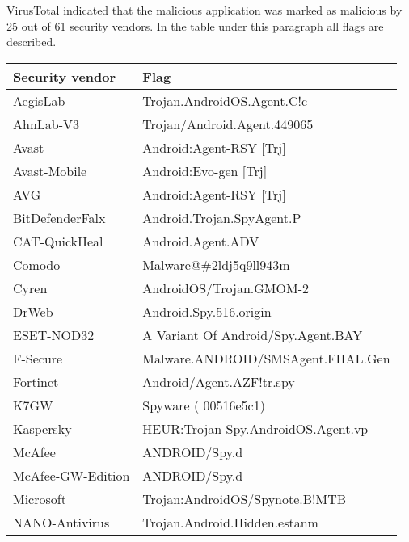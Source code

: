 VirusTotal indicated that the malicious application was marked as malicious by 25 out of 61 security vendors.
In the table under this paragraph all flags are described.

\begin{tabular}{|l|l|}
    \hline
    \textbf{Security vendor} & \textbf{Flag}                        \\ \hline
    AegisLab                 & Trojan.AndroidOS.Agent.C!c           \\ \hline
    AhnLab-V3                & Trojan/Android.Agent.449065          \\ \hline
    Avast                    & Android:Agent-RSY {[}Trj{]}          \\ \hline
    Avast-Mobile             & Android:Evo-gen {[}Trj{]}            \\ \hline
    AVG                      & Android:Agent-RSY {[}Trj{]}          \\ \hline
    BitDefenderFalx          & Android.Trojan.SpyAgent.P            \\ \hline
    CAT-QuickHeal            & Android.Agent.ADV                    \\ \hline
    Comodo                   & Malware@\#2ldj5q9ll943m              \\ \hline
    Cyren                    & AndroidOS/Trojan.GMOM-2              \\ \hline
    DrWeb                    & Android.Spy.516.origin               \\ \hline
    ESET-NOD32               & A Variant Of Android/Spy.Agent.BAY   \\ \hline
    F-Secure                 & Malware.ANDROID/SMSAgent.FHAL.Gen    \\ \hline
    Fortinet                 & Android/Agent.AZF!tr.spy             \\ \hline
    K7GW                     & Spyware ( 00516e5c1)                 \\ \hline
    Kaspersky                & HEUR:Trojan-Spy.AndroidOS.Agent.vp   \\ \hline
    McAfee                   & ANDROID/Spy.d                        \\ \hline
    McAfee-GW-Edition        & ANDROID/Spy.d                        \\ \hline
    Microsoft                & Trojan:AndroidOS/Spynote.B!MTB       \\ \hline
    NANO-Antivirus           & Trojan.Android.Hidden.estanm         \\ \hline

\end{tabular}

